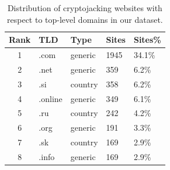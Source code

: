 \documentclass[acmlarge]{acmart}
\begin{document}
\begin{table}[t]
\centering
\caption{Distribution of cryptojacking websites with respect to top-level domains in our dataset. }
\label{tab:pixalate}

\begin{tabular}{|c|l|l|l|l|}
\hline
{\textbf{Rank}} & {\textbf{TLD}} & {\textbf{Type}} & {\textbf{Sites}} & {\textbf{Sites\%}} \\ \hline
1 & .com                                                   & generic                                                   & 1945                                        & 34.1\%                                      \\ \hline
2 & .net                                                   & generic                                                   &359                                         & 6.2\%                                       \\ \hline

3 & .si                                                    & country                                                   & 358                                         & 6.2\%                                       \\ \hline
4 & .online                                                & generic                                                   & 349                                         & 6.1\%                                       \\ \hline

5 & .ru                                                    & country                                                   &242                                         & 4.2\%                                       \\ \hline
6 & .org                                                   & generic                                                   &191                                        & 3.3\%                                       \\ \hline
7 & .sk                                                    & country                                                   &169                                         & 2.9\%                                       \\ \hline
8 & .info                                                  & generic                                                   &169                                         & 2.9\%                                       \\ \hline


\end{tabular}
\end{table}
\end{document}
